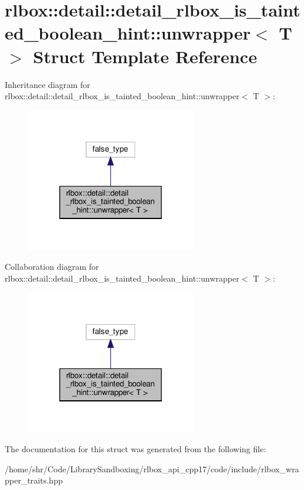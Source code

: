 \hypertarget{structrlbox_1_1detail_1_1detail__rlbox__is__tainted__boolean__hint_1_1unwrapper}{}\section{rlbox\+:\+:detail\+:\+:detail\+\_\+rlbox\+\_\+is\+\_\+tainted\+\_\+boolean\+\_\+hint\+:\+:unwrapper$<$ T $>$ Struct Template Reference}
\label{structrlbox_1_1detail_1_1detail__rlbox__is__tainted__boolean__hint_1_1unwrapper}


Inheritance diagram for rlbox\+:\+:detail\+:\+:detail\+\_\+rlbox\+\_\+is\+\_\+tainted\+\_\+boolean\+\_\+hint\+:\+:unwrapper$<$ T $>$\+:
\nopagebreak
\begin{figure}[H]
\begin{center}
\leavevmode
\includegraphics[width=209pt]{structrlbox_1_1detail_1_1detail__rlbox__is__tainted__boolean__hint_1_1unwrapper__inherit__graph}
\end{center}
\end{figure}


Collaboration diagram for rlbox\+:\+:detail\+:\+:detail\+\_\+rlbox\+\_\+is\+\_\+tainted\+\_\+boolean\+\_\+hint\+:\+:unwrapper$<$ T $>$\+:
\nopagebreak
\begin{figure}[H]
\begin{center}
\leavevmode
\includegraphics[width=209pt]{structrlbox_1_1detail_1_1detail__rlbox__is__tainted__boolean__hint_1_1unwrapper__coll__graph}
\end{center}
\end{figure}


The documentation for this struct was generated from the following file\+:\begin{DoxyCompactItemize}
\item 
/home/shr/\+Code/\+Library\+Sandboxing/rlbox\+\_\+api\+\_\+cpp17/code/include/rlbox\+\_\+wrapper\+\_\+traits.\+hpp\end{DoxyCompactItemize}
